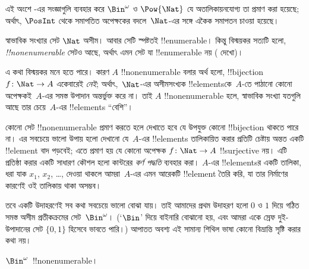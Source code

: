 \documentclass[../../../include/open-logic-section]{subfiles}
\begin{document}


\begin{editorial}
  এই অংশে -এর সংজ্ঞাগুলি ব্যবহার করে $\Bin^\omega$ ও $\Pow{\Nat}$ যে অতালিকায়নযোগ্য তা প্রমাণ করা হয়েছে; অর্থাৎ, $\PosInt$ থেকে সমাপতিত অপেক্ষকের বদলে~$\Nat$-এর সঙ্গে একৈক সমাপতন চাওয়া হয়েছে।
\end{editorial}

\begin{explain}
স্বাভাবিক সংখ্যার সেট $\Nat$ অসীম। আবার সেটি স্পষ্টতই !!{enumerable}। কিন্তু বিস্ময়কর সত্যটি হলো,
\emph{!!{nonenumerable}} সেটও আছে, অর্থাৎ এমন সেট যা !!{enumerable} নয়
( দেখো)।

এ কথা বিস্ময়কর মনে হতে পারে। কারণ $A$ !!{nonenumerable} বলার অর্থ হলো,
!!{bijection} $f \colon \Nat \to A$ একেবারেই \emph{নেই}; অর্থাৎ,~$\Nat$-এর অসীমসংখ্যক !!{element}sকে~$A$-তে পাঠানো কোনো অপেক্ষকই~$A$-এর সমস্ত উপাদান অন্তর্ভুক্ত করে না। তাই $A$ !!{nonenumerable} হলে, স্বাভাবিক সংখ্যা যতগুলি আছে তার চেয়ে~$A$-এর !!{element}s ``বেশি''।

কোনো সেট !!{nonenumerable} প্রমাণ করতে হলে দেখাতে হবে যে উপযুক্ত কোনো !!{bijection} থাকতে পারে না। এর সবচেয়ে ভালো উপায় হলো দেখানো যে~$A$-এর !!{element}s তালিকায়িত করার প্রতিটি চেষ্টায় অন্তত একটি !!{element} বাদ পড়বেই; এতে প্রমাণ হয় যে কোনো অপেক্ষক $f\colon \Nat \to A$ !!{surjective} নয়। এটি প্রতিষ্ঠা করার একটি সাধারণ কৌশল হলো কান্টরের \emph{কর্ণ পদ্ধতি} ব্যবহার করা। $A$-এর !!{element}sর একটি তালিকা, ধরা যাক $x_1$, $x_2$, \dots, দেওয়া থাকলে আমরা~$A$-এর এমন আরেকটি !!{element} তৈরি করি, যা তার নির্মাণের কারণেই ওই তালিকায় থাকা অসম্ভব।

তবে একটি উদাহরণেই সব কথা সবচেয়ে ভালো বোঝা যায়। তাই আমাদের প্রথম উদাহরণ হলো $0$ ও $1$ দিয়ে গঠিত সমস্ত অসীম প্রতীকক্রমের সেট~$\Bin^\omega$। (`$\Bin$' দিয়ে বাইনারি বোঝানো হয়, এবং আমরা একে স্রেফ দুই-উপাদানের সেট
$\{0,1\}$ হিসেবে ভাবতে পারি।) আপাতত অবশ্য এই সামান্য শিথিল ভাষা কোনো বিভ্রান্তি সৃষ্টি করার কথা নয়।
\end{explain}

\begin{thm}
$\Bin^\omega$~!!{nonenumerable}।
\end{thm}
\end{document}
